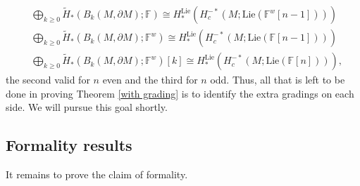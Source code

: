 \documentclass{compositio}
\theoremstyle{definition}\newtheorem{definition}{Definition}[section]
\theoremstyle{theorem}\newtheorem{lemma}[definition]{Lemma}
\theoremstyle{remark}\newtheorem*{conventions}{Conventions}
\theoremstyle{remark}\newtheorem*{acknowledgments}{Acknowledgments}
\theoremstyle{remark}\newtheorem*{outline}{Outline}
\theoremstyle{remark}\newtheorem*{questions}{Questions}
\theoremstyle{remark}\newtheorem{example}[definition]{Example}
\theoremstyle{definition}\newtheorem{construction}[definition]{Construction}
\theoremstyle{definition}\newtheorem*{convention}{Convention}
\theoremstyle{definition}\newtheorem*{conjecture}{Conjecture}
\theoremstyle{theorem}\newtheorem{theorem}[definition]{Theorem}
\theoremstyle{theorem}\newtheorem{paradigm}[definition]{Paradigm}
\theoremstyle{remark}\newtheorem{remark}[definition]{Remark}
\theoremstyle{corollary}\newtheorem{corollary}[definition]{Corollary}
\theoremstyle{theorem}\newtheorem{proposition}[definition]{Proposition}
\theoremstyle{definition}\newtheorem{question}[definition]{Question}
\begin{document}
\begin{align*}&\bigoplus_{k\geq0}\widetilde H_*(B_k(M,\partial M);\mathbb{F})\cong H_*^{\mathrm{Lie}}(H_c^{-*}(M;{\mathrm{Lie}}(\mathbb{F}^w[n-1])))\\&\bigoplus_{k\geq0}\widetilde{H}_*(B_k(M,\partial M);\mathbb{F}^w)\cong H_*^{\mathrm{Lie}}(H_{c}^{-*}(M;{\mathrm{Lie}}(\mathbb{F}[n-1])))\\
&\bigoplus_{k\geq0}\widetilde{H}_*(B_k(M,\partial M);\mathbb{F}^w)[k]\cong H_*^{\mathrm{Lie}}(H_{c}^{-*}(M;{\mathrm{Lie}}(\mathbb{F}[n]))),\end{align*} the second valid for $n$ even and the third for $n$ odd. Thus, all that is left to be done in proving Theorem \ref{with grading} is to identify the extra gradings on each side. We will pursue this goal shortly.

\subsection{Formality results}
It remains to prove the claim of formality.
\end{document}
